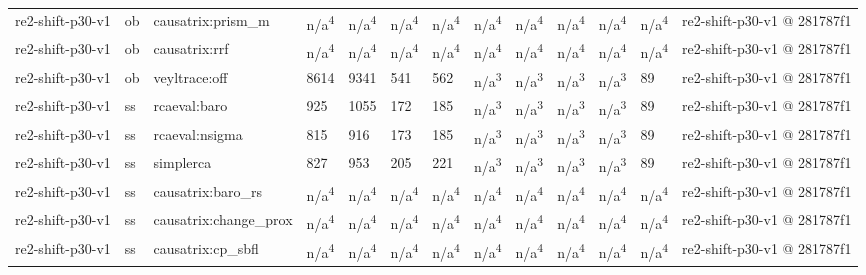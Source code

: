 \begin{table}[t]
\begin{tabular}{lllllllllllll}
re2-shift-p30-v1 & ob & causatrix:prism\_m & n/a\textsuperscript{4} & n/a\textsuperscript{4} & n/a\textsuperscript{4} & n/a\textsuperscript{4} & n/a\textsuperscript{4} & n/a\textsuperscript{4} & n/a\textsuperscript{4} & n/a\textsuperscript{4} & n/a\textsuperscript{4} & re2-shift-p30-v1 @ 281787f1 \\
re2-shift-p30-v1 & ob & causatrix:rrf & n/a\textsuperscript{4} & n/a\textsuperscript{4} & n/a\textsuperscript{4} & n/a\textsuperscript{4} & n/a\textsuperscript{4} & n/a\textsuperscript{4} & n/a\textsuperscript{4} & n/a\textsuperscript{4} & n/a\textsuperscript{4} & re2-shift-p30-v1 @ 281787f1 \\
re2-shift-p30-v1 & ob & veyltrace:off & 8614 & 9341 & 541 & 562 & n/a\textsuperscript{3} & n/a\textsuperscript{3} & n/a\textsuperscript{3} & n/a\textsuperscript{3} & 89 & re2-shift-p30-v1 @ 281787f1 \\
re2-shift-p30-v1 & ss & rcaeval:baro & 925 & 1055 & 172 & 185 & n/a\textsuperscript{3} & n/a\textsuperscript{3} & n/a\textsuperscript{3} & n/a\textsuperscript{3} & 89 & re2-shift-p30-v1 @ 281787f1 \\
re2-shift-p30-v1 & ss & rcaeval:nsigma & 815 & 916 & 173 & 185 & n/a\textsuperscript{3} & n/a\textsuperscript{3} & n/a\textsuperscript{3} & n/a\textsuperscript{3} & 89 & re2-shift-p30-v1 @ 281787f1 \\
re2-shift-p30-v1 & ss & simplerca & 827 & 953 & 205 & 221 & n/a\textsuperscript{3} & n/a\textsuperscript{3} & n/a\textsuperscript{3} & n/a\textsuperscript{3} & 89 & re2-shift-p30-v1 @ 281787f1 \\
re2-shift-p30-v1 & ss & causatrix:baro\_rs & n/a\textsuperscript{4} & n/a\textsuperscript{4} & n/a\textsuperscript{4} & n/a\textsuperscript{4} & n/a\textsuperscript{4} & n/a\textsuperscript{4} & n/a\textsuperscript{4} & n/a\textsuperscript{4} & n/a\textsuperscript{4} & re2-shift-p30-v1 @ 281787f1 \\
re2-shift-p30-v1 & ss & causatrix:change\_prox & n/a\textsuperscript{4} & n/a\textsuperscript{4} & n/a\textsuperscript{4} & n/a\textsuperscript{4} & n/a\textsuperscript{4} & n/a\textsuperscript{4} & n/a\textsuperscript{4} & n/a\textsuperscript{4} & n/a\textsuperscript{4} & re2-shift-p30-v1 @ 281787f1 \\
re2-shift-p30-v1 & ss & causatrix:cp\_sbfl & n/a\textsuperscript{4} & n/a\textsuperscript{4} & n/a\textsuperscript{4} & n/a\textsuperscript{4} & n/a\textsuperscript{4} & n/a\textsuperscript{4} & n/a\textsuperscript{4} & n/a\textsuperscript{4} & n/a\textsuperscript{4} & re2-shift-p30-v1 @ 281787f1 \\

\end{tabular}
\end{table}
